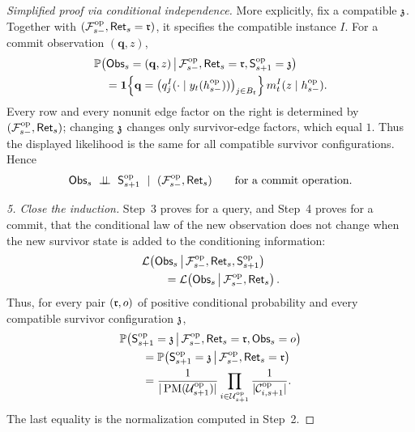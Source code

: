 {\begin{proof}[Simplified proof via conditional independence]
More explicitly, fix a compatible
\(\SurvivorConfigA\).  Together with
\((\OpAnalyticField{s},\OpRetiredRecord{s}=\RetiredRecordValue)\), it
specifies the compatible instance \(I\).  For a commit observation
\((\mathbf q,z)\),
\begin{align*}
 &\mathbb P\!\left(
   \OpObservation{s}=(\mathbf q,z)
   \,\middle|\,
   \OpAnalyticField{s},
   \OpRetiredRecord{s}=\RetiredRecordValue,
   \OpSurvivorState{s+1}=\SurvivorConfigA\right)\\
 &\quad=
 \mathbf 1\!\left\{
  \mathbf q=
  \bigl(
   \HardOracleRow{I}{y_t(\OpVisibleHistory{s})}{j}
  \bigr)_{j\in B_t}
 \right\}
 \HardMidpointKernel{t}{I}
   (z\mid\OpVisibleHistory{s}).
\end{align*}
Every row and every nonunit edge factor on the right is determined by
\((\OpAnalyticField{s},\OpRetiredRecord{s})\); changing
\(\SurvivorConfigA\) changes only survivor-edge factors, which equal \(1\).
Thus the displayed likelihood is the same for all compatible survivor
configurations.  Hence
\[
 \OpObservation{s}\ \perp\!\!\!\perp\ \OpSurvivorState{s+1}
 \ \mid\
 (\OpAnalyticField{s},\OpRetiredRecord{s})
 \qquad\text{for a commit operation.}
\]

\emph{5. Close the induction.}
Step~3 proves for a query, and Step~4 proves for a commit, that the
conditional law of the new observation does not change when the new
survivor state is added to the conditioning information:
\begin{align*}
 &\mathcal L\!\left(
   \OpObservation{s}\,\middle|\,
   \OpAnalyticField{s},\OpRetiredRecord{s},
   \OpSurvivorState{s+1}\right)\\
 &\qquad=
 \mathcal L\!\left(
   \OpObservation{s}\,\middle|\,
   \OpAnalyticField{s},\OpRetiredRecord{s}\right).
\end{align*}
Thus, for every pair
\((\RetiredRecordValue,o)\) of positive conditional probability and every
compatible survivor configuration \(\SurvivorConfigA\),
\begin{align*}
 &\mathbb P\!\left(
   \OpSurvivorState{s+1}=\SurvivorConfigA
   \,\middle|\,
   \OpAnalyticField{s},
   \OpRetiredRecord{s}=\RetiredRecordValue,
   \OpObservation{s}=o\right)\\
 &\qquad=
 \mathbb P\!\left(
   \OpSurvivorState{s+1}=\SurvivorConfigA
   \,\middle|\,
   \OpAnalyticField{s},
   \OpRetiredRecord{s}=\RetiredRecordValue\right)\\
 &\qquad=
 \frac{1}{|\operatorname{PM}(\OpUnresolvedVertices{s+1})|}
 \prod_{i\in\OpUnresolvedVertices{s+1}}
   \frac{1}{|\OpRemainingTriggers{i}{s+1}|}.
\end{align*}
The last equality is the normalization computed in Step~2.


\end{proof}}
